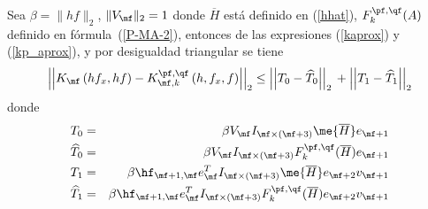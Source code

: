Sea $\beta=\lVert hf \rVert_2$, $\lVert V_\mf \rVert_2=1$ donde
 $\overline{H}$ est\'a definido en (\ref{hhat}), $F_k^{\pf,\qf}(A)$ definido en f\'ormula~(\ref{P-MA-2}),
  entonces de las expresiones (\ref{kaprox}) y (\ref{kp_aprox}), y por desigualdad triangular se tiene
 \begin{equation}\label{proffktheouneq} 
      \left\lvert\left\lvert  K_{\mf}\left( hf_x , hf \right) -  
 K_{\mf,k}^{\pf,\qf}\left( h,  f_x , f \right)\right\rvert\right\rvert_2 
 \leq \left\lvert\left\lvert T_0 - 
  \widehat{T}_0\right\rvert\right\rvert_2 \\
 +\left\lvert\left\lvert T_1 - \widehat{T}_1
  \right\rvert\right\rvert_2
 \end{equation}
 donde 
 \begin{eqnarray*}
T_0&=&\beta V_{\mf}I_{\mf\times (\mf+3)}\me{\overline{H}}e_{\mf+1}\\
\widehat{T}_0&=&\beta V_{\mf}I_{\mf\times (\mf+3)}F_k^{\pf,\qf}(\overline{H})e_{\mf+1}\\
T_1&=&\beta \hf_{\mf+1,\mf}e_\mf^TI_{\mf\times (\mf+3)}\me{\overline{H}}e_{\mf+2}v_{\mf+1}\\
\widehat{T}_1&=&\beta \hf_{\mf+1,\mf}e_\mf^TI_{\mf\times (\mf+3)}F_k^{\pf,\qf}(\overline{H})e_{\mf+2}v_{\mf+1}
 \end{eqnarray*}
 
